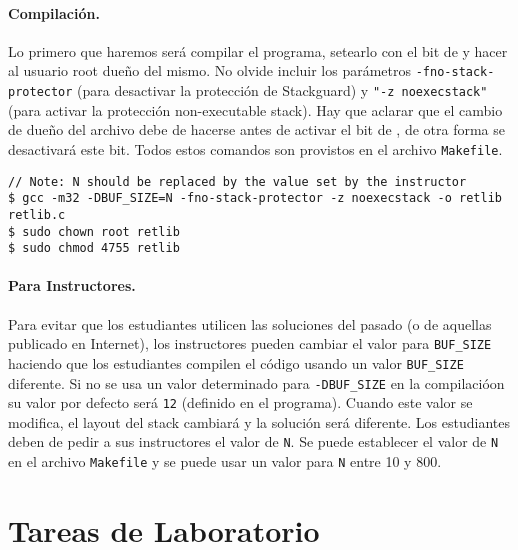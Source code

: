 \vspace{0.1in}
\paragraph{Compilación.} 
Lo primero que haremos será compilar el programa, setearlo con el bit de \setuid y hacer al usuario root dueño del mismo.
No olvide incluir los parámetros \texttt{-fno-stack-protector} (para desactivar la protección de Stackguard) y  \texttt{"-z noexecstack"} (para activar la protección non-executable stack).
Hay que aclarar que el cambio de dueño del archivo debe de hacerse antes de activar el bit de \setuid, de otra forma se desactivará este bit.
Todos estos comandos son provistos en el archivo \texttt{Makefile}. 


\begin{lstlisting}
// Note: N should be replaced by the value set by the instructor
$ gcc -m32 -DBUF_SIZE=N -fno-stack-protector -z noexecstack -o retlib retlib.c
$ sudo chown root retlib           
$ sudo chmod 4755 retlib           
\end{lstlisting}


\paragraph{Para Instructores.}
Para evitar que los estudiantes utilicen las soluciones del pasado (o de aquellas
publicado en Internet), los instructores pueden cambiar el
valor para \texttt{BUF\_SIZE} haciendo que los estudiantes compilen el código usando un valor \texttt{BUF\_SIZE} diferente.
Si no se usa un valor determinado para \texttt{-DBUF\_SIZE} en la compilacióon 
su valor por defecto será \texttt{12} (definido en el programa).
Cuando este valor se modifica, el layout del stack  cambiará y la solución será diferente.
Los estudiantes deben de pedir a sus instructores
el valor de \texttt{N}. Se puede establecer el valor de \texttt{N}
en el archivo \texttt{Makefile} y se puede usar un valor para \texttt{N} entre 10 y 800.



\section{Tareas de Laboratorio}



